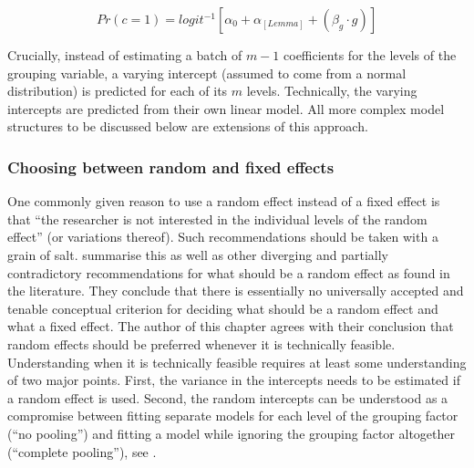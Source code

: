 \begin{equation}
  Pr(c=1)=logit^{-1}\left[\alpha_0+\alpha_{[Lemma]}+(\beta_{g}\cdot g)\right]
  \label{eq:002a}
\end{equation}

Crucially, instead of estimating a batch of $m-1$ coefficients for the levels of the grouping variable, a varying intercept (assumed to come from a normal distribution) is predicted for each of its $m$ levels.
Technically, the varying intercepts are predicted from their own linear model.
All more complex model structures to be discussed below are extensions of this approach.

\subsubsection{Choosing between random and fixed effects}
\label{sec:choosingbetweenrandomandfixedeffects}

One commonly given reason to use a random effect instead of a fixed effect is that ``the researcher is not interested in the individual levels of the random effect'' (or variations thereof).
Such recommendations should be taken with a grain of salt.
\citet[245--247]{GelmanHill2007} summarise this as well as other diverging and partially contradictory recommendations for what should be a random effect as found in the literature.
They conclude that there is essentially no universally accepted and tenable conceptual criterion for deciding what should be a random effect and what a fixed effect.
The author of this chapter agrees with their conclusion that random effects should be preferred whenever it is technically feasible.
Understanding when it is technically feasible requires at least some understanding of two major points.
First, the variance in the intercepts needs to be estimated if a random effect is used.
Second, the random intercepts can be understood as a compromise between fitting separate models for each level of the grouping factor (``no pooling'') and fitting a model while ignoring the grouping factor altogether (``complete pooling''), see \citet[Ch.~12]{GelmanHill2007}.

